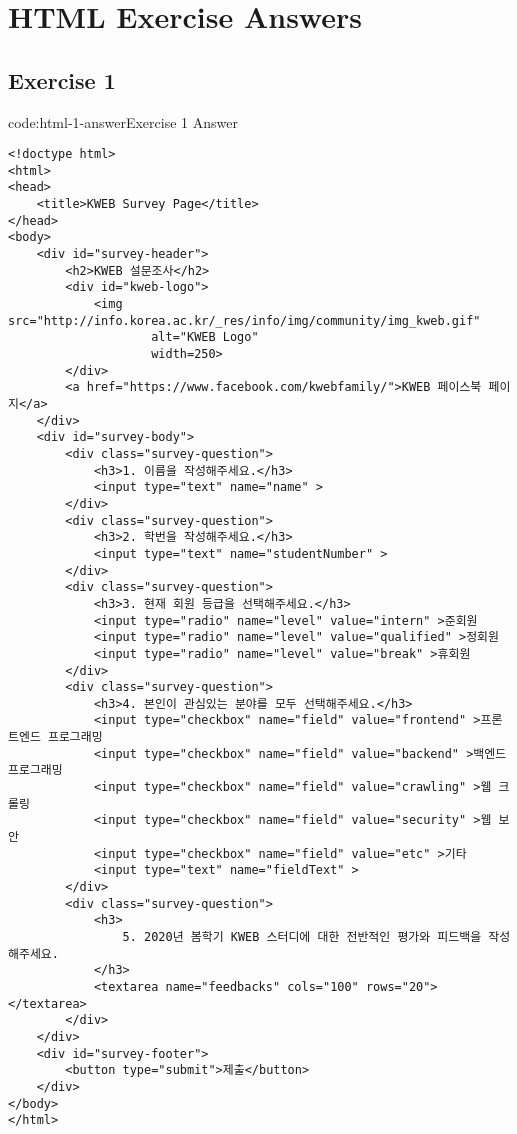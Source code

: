 \section{HTML Exercise Answers} \label{sect:html-exercise-answers}

\subsection*{Exercise 1}

\begin{codeenv}{code:html-1-answer}{Exercise 1 Answer}\begin{verbatim}
<!doctype html>
<html>
<head>
    <title>KWEB Survey Page</title>
</head>
<body>
    <div id="survey-header">
        <h2>KWEB 설문조사</h2>
        <div id="kweb-logo">
            <img src="http://info.korea.ac.kr/_res/info/img/community/img_kweb.gif"
                    alt="KWEB Logo"
                    width=250>
        </div>
        <a href="https://www.facebook.com/kwebfamily/">KWEB 페이스북 페이지</a>
    </div>
    <div id="survey-body">
        <div class="survey-question">
            <h3>1. 이름을 작성해주세요.</h3>
            <input type="text" name="name" >
        </div>
        <div class="survey-question">
            <h3>2. 학번을 작성해주세요.</h3>
            <input type="text" name="studentNumber" >
        </div>
        <div class="survey-question">
            <h3>3. 현재 회원 등급을 선택해주세요.</h3>
            <input type="radio" name="level" value="intern" >준회원
            <input type="radio" name="level" value="qualified" >정회원
            <input type="radio" name="level" value="break" >휴회원
        </div>
        <div class="survey-question">
            <h3>4. 본인이 관심있는 분야를 모두 선택해주세요.</h3>
            <input type="checkbox" name="field" value="frontend" >프론트엔드 프로그래밍
            <input type="checkbox" name="field" value="backend" >백엔드 프로그래밍
            <input type="checkbox" name="field" value="crawling" >웹 크롤링
            <input type="checkbox" name="field" value="security" >웹 보안
            <input type="checkbox" name="field" value="etc" >기타
            <input type="text" name="fieldText" >
        </div>
        <div class="survey-question">
            <h3>
                5. 2020년 봄학기 KWEB 스터디에 대한 전반적인 평가와 피드백을 작성해주세요.
            </h3>
            <textarea name="feedbacks" cols="100" rows="20"></textarea>
        </div>
    </div>
    <div id="survey-footer">
        <button type="submit">제출</button>
    </div>
</body>
</html>
\end{verbatim}
\end{codeenv}
